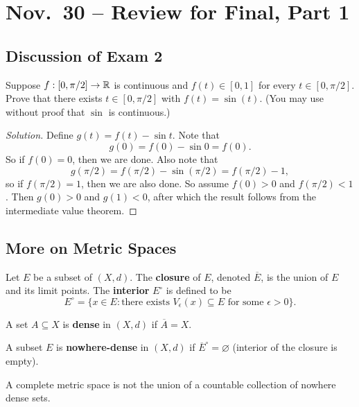 \chapter{Nov.~30 -- Review for Final, Part 1}

\section{Discussion of Exam 2}
\begin{exercise}
  Suppose $f : [0, \pi / 2] \to \mathbb{R}$ is continuous and
  $f(t) \in [0, 1]$ for every $t \in [0, \pi / 2]$. Prove
  that there exists $t \in [0, \pi / 2]$ with
  $f(t) = \sin (t)$. (You may use without proof that
  $\sin$ is continuous.)
\end{exercise}

\begin{proof}[Solution]
  Define $g(t) = f(t) - \sin t$. Note that
  \[g(0) = f(0) - \sin 0 = f(0).\]
  So if $f(0) = 0$, then we are done. Also note that
  \[
    g(\pi / 2) = f(\pi / 2) - \sin (\pi / 2) = f(\pi / 2) - 1,
  \]
  so if $f(\pi / 2) = 1$, then we are also done. So
  assume $f(0) > 0$ and $f(\pi / 2) < 1$. Then $g(0) > 0$
  and $g(1) < 0$, after which the result follows from the
  intermediate value theorem.
\end{proof}

\section{More on Metric Spaces}
\begin{definition}
  Let $E$ be a subset of $(X, d)$. The \textbf{closure}
  of $E$, denoted $\overline{E}$, is the union of $E$
  and its limit points. The \textbf{interior} $E^\circ$ is defined to be
  \[
    E^\circ = \{x \in E : \text{there exists $V_\epsilon(x) \subseteq E$ for some $\epsilon > 0$}\}.
  \]
\end{definition}

\begin{definition}
  A set $A \subseteq X$ is \textbf{dense} in $(X, d)$ if
  $\overline{A} = X$.
\end{definition}

\begin{definition}
  A subset $E$ is \textbf{nowhere-dense} in $(X, d)$ if
  ${\overline{E}}^\circ = \varnothing$
  (interior of the closure is empty).
\end{definition}

\begin{theorem}
  A complete metric space is not the union of a countable
  collection of nowhere dense sets.
\end{theorem}

